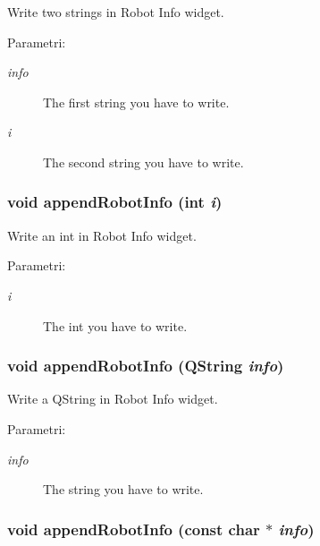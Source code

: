 Write two strings in Robot Info widget. \begin{Desc}
\item[Parametri:]
\begin{description}
\item[{\em info}]The first string you have to write. \item[{\em i}]The second string you have to write. \end{description}
\end{Desc}
\hypertarget{classMainWindow_940ed66f4b3c536f9eee7975099ab015}{
\subsubsection[appendRobotInfo]{\setlength{\rightskip}{0pt plus 5cm}void append\-Robot\-Info (int {\em i})}}
\label{classMainWindow_940ed66f4b3c536f9eee7975099ab015}


Write an int in Robot Info widget. \begin{Desc}
\item[Parametri:]
\begin{description}
\item[{\em i}]The int you have to write. \end{description}
\end{Desc}
\hypertarget{classMainWindow_2f18074a740a58891fd5b989dd71cf3f}{
\subsubsection[appendRobotInfo]{\setlength{\rightskip}{0pt plus 5cm}void append\-Robot\-Info (QString {\em info})}}
\label{classMainWindow_2f18074a740a58891fd5b989dd71cf3f}


Write a QString in Robot Info widget. \begin{Desc}
\item[Parametri:]
\begin{description}
\item[{\em info}]The string you have to write. \end{description}
\end{Desc}
\hypertarget{classMainWindow_a9b4df136ec15062f2eea2c3673c4b57}{
\subsubsection[appendRobotInfo]{\setlength{\rightskip}{0pt plus 5cm}void append\-Robot\-Info (const char $\ast$ {\em info})}}
\label{classMainWindow_a9b4df136ec15062f2eea2c3673c4b57}


